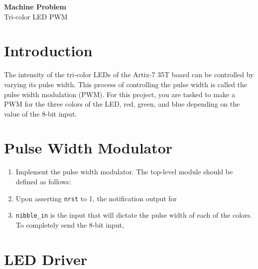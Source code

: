 \clearpage
\setcounter{page}{1}

\begin{center}
    \vspace*{3em}
    {\LARGE \textbf{Machine Problem}}\\
    {\vspace{1.5em}}
    {\large Tri-color LED PWM}\\
\end{center}

\section{Introduction}
    The intensity of the tri-color LEDs of the Artix-7\texttrademark{} 35T board can be controlled by varying its pulse width. This process of controlling the pulse width is called the pulse width modulation (PWM). For this project, you are tasked to make a PWM for the three colors of the LED, red, green, and blue depending on the value of the 8-bit input.

\section{Pulse Width Modulator}

\begin{enumerate}
    \item Implement the pulse width modulator. The top-level module should be defined as follows:
    
    

    \item Upon asserting \texttt{nrst} to 1, the notification output for 
    \item \texttt{nibble_in} is the input that will dictate the pulse width of each of the colors. To completely send the 8-bit input, 
\end{enumerate}

\section{LED Driver}

